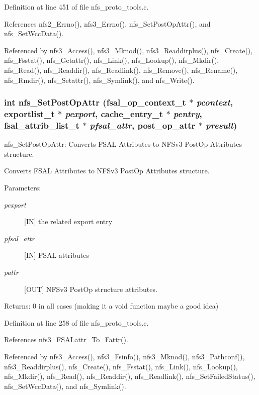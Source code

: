 Definition at line 451 of file nfs\_\-proto\_\-tools.c.

References nfs2\_\-Errno(), nfs3\_\-Errno(), nfs\_\-Set\-Post\-Op\-Attr(), and nfs\_\-Set\-Wcc\-Data().

Referenced by nfs3\_\-Access(), nfs3\_\-Mknod(), nfs3\_\-Readdirplus(), nfs\_\-Create(), nfs\_\-Fsstat(), nfs\_\-Getattr(), nfs\_\-Link(), nfs\_\-Lookup(), nfs\_\-Mkdir(), nfs\_\-Read(), nfs\_\-Readdir(), nfs\_\-Readlink(), nfs\_\-Remove(), nfs\_\-Rename(), nfs\_\-Rmdir(), nfs\_\-Setattr(), nfs\_\-Symlink(), and nfs\_\-Write().
\subsubsection{\setlength{\rightskip}{0pt plus 5cm}int nfs\_\-Set\-Post\-Op\-Attr (fsal\_\-op\_\-context\_\-t $\ast$ {\em pcontext}, exportlist\_\-t $\ast$ {\em pexport}, cache\_\-entry\_\-t $\ast$ {\em pentry}, fsal\_\-attrib\_\-list\_\-t $\ast$ {\em pfsal\_\-attr}, post\_\-op\_\-attr $\ast$ {\em presult})}\label{nfs__proto__tools_8c_a2}


nfs\_\-Set\-Post\-Op\-Attr: Converts FSAL Attributes to NFSv3 Post\-Op Attributes structure.

Converts FSAL Attributes to NFSv3 Post\-Op Attributes structure.

\begin{Desc}
\item[Parameters:]
\begin{description}
\item[{\em pexport}][IN] the related export entry \item[{\em pfsal\_\-attr}][IN] FSAL attributes \item[{\em pattr}][OUT] NFSv3 Post\-Op structure attributes.\end{description}
\end{Desc}
\begin{Desc}
\item[Returns:]0 in all cases (making it a void function maybe a good idea) \end{Desc}


Definition at line 258 of file nfs\_\-proto\_\-tools.c.

References nfs3\_\-FSALattr\_\-To\_\-Fattr().

Referenced by nfs3\_\-Access(), nfs3\_\-Fsinfo(), nfs3\_\-Mknod(), nfs3\_\-Pathconf(), nfs3\_\-Readdirplus(), nfs\_\-Create(), nfs\_\-Fsstat(), nfs\_\-Link(), nfs\_\-Lookup(), nfs\_\-Mkdir(), nfs\_\-Read(), nfs\_\-Readdir(), nfs\_\-Readlink(), nfs\_\-Set\-Failed\-Status(), nfs\_\-Set\-Wcc\-Data(), and nfs\_\-Symlink().
